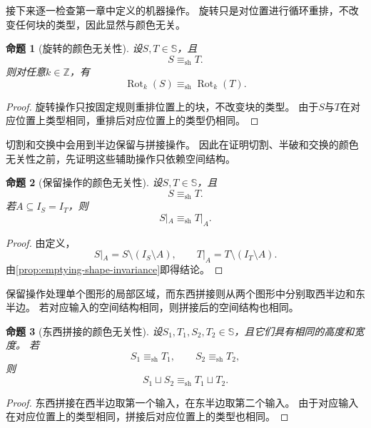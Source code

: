 \documentclass[UTF8,fontset=none]{ctexart}
\theoremstyle{cnthm}
\newtheorem{proposition}{命题}[section]
\begin{document}
			接下来逐一检查第一章中定义的机器操作。
			旋转只是对位置进行循环重排，不改变任何块的类型，因此显然与颜色无关。
			
			\begin{proposition}[旋转的颜色无关性]\label{prop:rot-shape-invariance}
				设$S,T\in\mathbb{S}$，且
				$$
				S\equiv_{\mathrm{sh}}T.
				$$
				则对任意$k\in\mathbb{Z}$，有
				$$
				\operatorname{Rot}_k(S)
				\equiv_{\mathrm{sh}}
				\operatorname{Rot}_k(T).
				$$
			\end{proposition}
			
			\begin{proof}
				旋转操作只按固定规则重排位置上的块，不改变块的类型。
				由于$S$与$T$在对应位置上类型相同，重排后对应位置上的类型仍相同。
			\end{proof}
			
			切割和交换中会用到半边保留与拼接操作。
			因此在证明切割、半破和交换的颜色无关性之前，先证明这些辅助操作只依赖空间结构。
			
			\begin{proposition}[保留操作的颜色无关性]\label{prop:restriction-shape-invariance}
				设$S,T\in\mathbb{S}$，且
				$$
				S\equiv_{\mathrm{sh}}T.
				$$
				若$A\subseteq I_S=I_T$，则
				$$
				S|_A\equiv_{\mathrm{sh}}T|_A.
				$$
			\end{proposition}
			
			\begin{proof}
				由定义，
				$$
				S|_A=S\setminus(I_S\setminus A),
				\qquad
				T|_A=T\setminus(I_T\setminus A).
				$$
				由\cref{prop:emptying-shape-invariance}即得结论。
			\end{proof}
			
			保留操作处理单个图形的局部区域，而东西拼接则从两个图形中分别取西半边和东半边。
			若对应输入的空间结构相同，则拼接后的空间结构也相同。
			
			\begin{proposition}[东西拼接的颜色无关性]\label{prop:horizontal-glue-shape-invariance}
				设$S_1,T_1,S_2,T_2\in\mathbb{S}$，且它们具有相同的高度和宽度。
				若
				$$
				S_1\equiv_{\mathrm{sh}}T_1,
				\qquad
				S_2\equiv_{\mathrm{sh}}T_2,
				$$
				则
				$$
				S_1\sqcup S_2
				\equiv_{\mathrm{sh}}
				T_1\sqcup T_2.
				$$
			\end{proposition}
			
			\begin{proof}
				东西拼接在西半边取第一个输入，在东半边取第二个输入。
				由于对应输入在对应位置上的类型相同，拼接后对应位置上的类型也相同。
			\end{proof}
			
\end{document}
